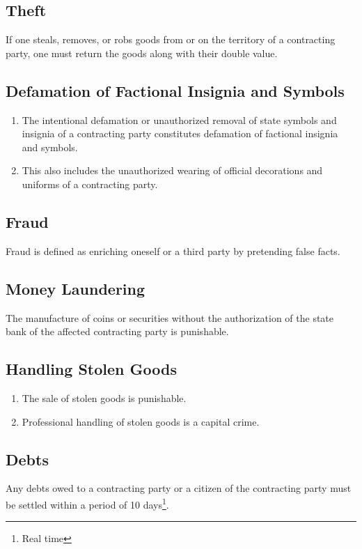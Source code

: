 \documentclass{article}
\begin{document}
\subsection{Theft}
If one steals, removes, or robs goods from or on the territory of a contracting party, one must return the goods along with their double value.

\subsection{Defamation of Factional Insignia and Symbols}
\begin{enumerate}[(1)]
    \item The intentional defamation or unauthorized removal of state symbols and insignia of a contracting party constitutes defamation of factional insignia and symbols.
    \item This also includes the unauthorized wearing of official decorations and uniforms of a contracting party.
\end{enumerate}

\subsection{Fraud}
Fraud is defined as enriching oneself or a third party by pretending false facts.

\subsection{Money Laundering}
The manufacture of coins or securities without the authorization of the state bank of the affected contracting party is punishable.

\subsection{Handling Stolen Goods}
\begin{enumerate}[(1)]
    \item The sale of stolen goods is punishable.
    \item Professional handling of stolen goods is a capital crime.
\end{enumerate}

\subsection{Debts}
Any debts owed to a contracting party or a citizen of the contracting party must be settled within a period of 10 days\footnote{Real time}.
\end{document}
